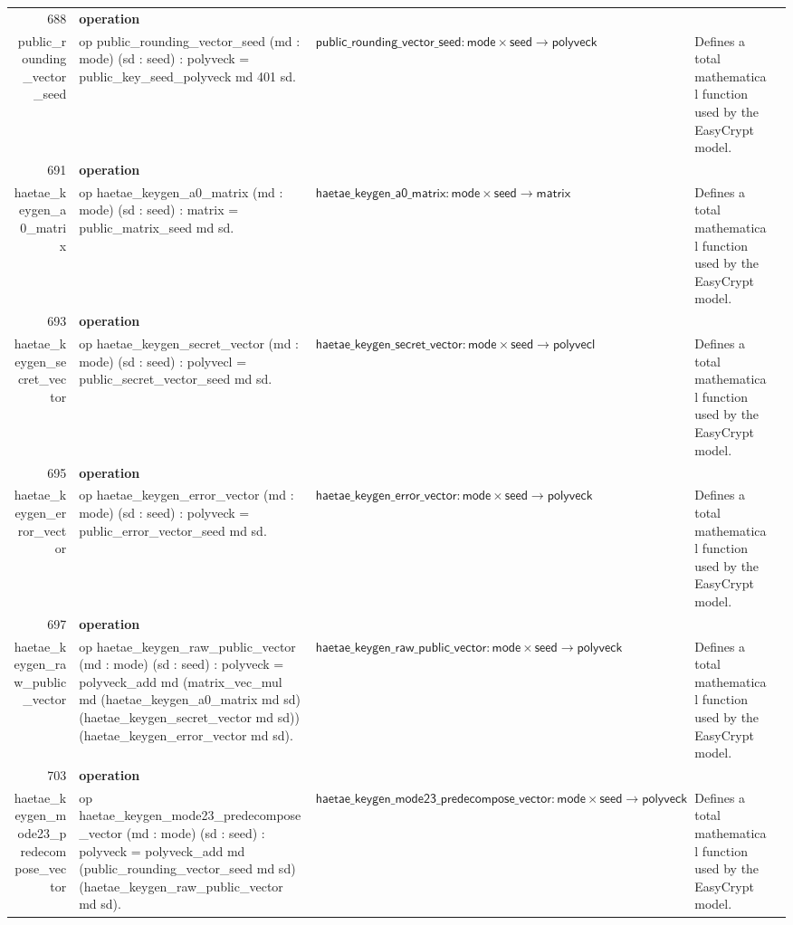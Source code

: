 \documentclass[10pt]{article}
\newcommand{\ec}[1]{\begingroup\ttfamily\scriptsize #1\endgroup}
\begin{document}
\begin{longtable}{r L{0.17\textwidth} L{0.26\textwidth} L{0.27\textwidth} L{0.20\textwidth}}
688 & \textbf{operation}\\\ec{public\_rounding\_vector\_seed} & \ec{op public\_rounding\_vector\_seed (md : mode) (sd : seed) : polyveck = public\_key\_seed\_polyveck md 401 sd.} & \(\mathsf{public\_rounding\_vector\_seed} : \mathsf{mode} \times \mathsf{seed} \to \mathsf{polyveck}\) & Defines a total mathematical function used by the EasyCrypt model. \\
691 & \textbf{operation}\\\ec{haetae\_keygen\_a0\_matrix} & \ec{op haetae\_keygen\_a0\_matrix (md : mode) (sd : seed) : matrix = public\_matrix\_seed md sd.} & \(\mathsf{haetae\_keygen\_a0\_matrix} : \mathsf{mode} \times \mathsf{seed} \to \mathsf{matrix}\) & Defines a total mathematical function used by the EasyCrypt model. \\
693 & \textbf{operation}\\\ec{haetae\_keygen\_secret\_vector} & \ec{op haetae\_keygen\_secret\_vector (md : mode) (sd : seed) : polyvecl = public\_secret\_vector\_seed md sd.} & \(\mathsf{haetae\_keygen\_secret\_vector} : \mathsf{mode} \times \mathsf{seed} \to \mathsf{polyvecl}\) & Defines a total mathematical function used by the EasyCrypt model. \\
695 & \textbf{operation}\\\ec{haetae\_keygen\_error\_vector} & \ec{op haetae\_keygen\_error\_vector (md : mode) (sd : seed) : polyveck = public\_error\_vector\_seed md sd.} & \(\mathsf{haetae\_keygen\_error\_vector} : \mathsf{mode} \times \mathsf{seed} \to \mathsf{polyveck}\) & Defines a total mathematical function used by the EasyCrypt model. \\
697 & \textbf{operation}\\\ec{haetae\_keygen\_raw\_public\_vector} & \ec{op haetae\_keygen\_raw\_public\_vector (md : mode) (sd : seed) : polyveck = polyveck\_add md (matrix\_vec\_mul md (haetae\_keygen\_a0\_matrix md sd) (haetae\_keygen\_secret\_vector md sd)) (haetae\_keygen\_error\_vector md sd).} & \(\mathsf{haetae\_keygen\_raw\_public\_vector} : \mathsf{mode} \times \mathsf{seed} \to \mathsf{polyveck}\) & Defines a total mathematical function used by the EasyCrypt model. \\
703 & \textbf{operation}\\\ec{haetae\_keygen\_mode23\_predecompose\_vector} & \ec{op haetae\_keygen\_mode23\_predecompose\_vector (md : mode) (sd : seed) : polyveck = polyveck\_add md (public\_rounding\_vector\_seed md sd) (haetae\_keygen\_raw\_public\_vector md sd).} & \(\mathsf{haetae\_keygen\_mode23\_predecompose\_vector} : \mathsf{mode} \times \mathsf{seed} \to \mathsf{polyveck}\) & Defines a total mathematical function used by the EasyCrypt model. \\

\end{longtable}
\end{document}
